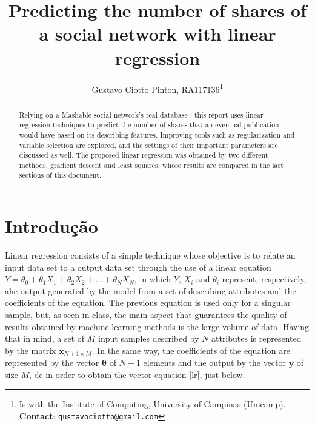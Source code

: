 \documentclass[10pt,twocolumn,letterpaper]{article}
\begin{document}
\title {Predicting the number of shares of a social network with linear regression }
\author{Gustavo Ciotto Pinton, RA117136\thanks{Is with the Institute of Computing, University of Campinas (Unicamp). \textbf{Contact}: \tt\small{gustavociotto@gmail.com}}}

\maketitle
\begin{abstract}
Relying on a Mashable social network's real database \cite{database}, this report uses linear regression techniques to predict the number of shares that an eventual publication would have based on its describing features. Improving tools such as regularization and variable selection are explored, and the settings of their important parameters are discussed as well. The proposed linear regression was obtained by two different methods, gradient descent and least squares, whose results are compared in the last sections of this document.
\end{abstract}

\section{Introdução}
\label{intro}

Linear regression consists of a simple technique whose objective is to relate an input data set to a output data set through the use of a linear equation \(Y = \theta_0 + \theta_1X_1 + \theta_2X_2 + \ldots + \theta_NX_N\), in which \(Y\), \(X_i\) and \(\theta_i\) represent, respectively, ahe output generated by the model from a set of describing attributes and the coefficients of the equation. The previous equation is used only for a singular sample, but, as seen in class, the main aspect that guarantees the quality of results obtained by machine learning methods is the large volume of data. Having that in mind, a set of \(M\)  input samples described by \(N\) attributes is represented by the matrix \(\bm{x}_{N+1\times M}\).  In the same way, the coefficients of the equation are represented by the vector \(\bm{\theta}\) of \(N+1\) elements and the output by the vector \(\bm{y}\) of size \(M\), de in order to obtain the vector equation \ref{lr}, just below.
\end{document}
